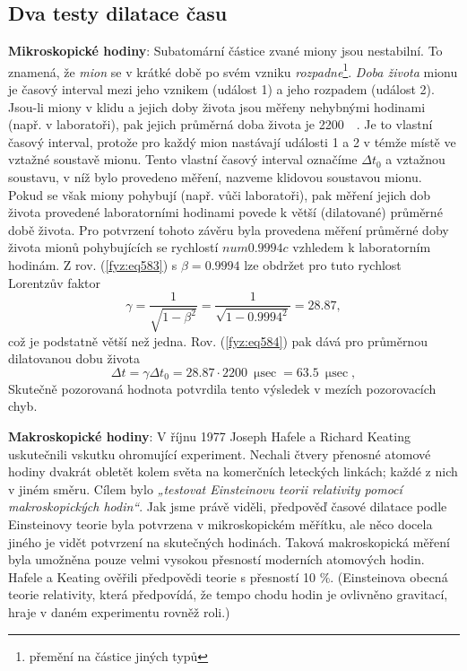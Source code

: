     \subsection{Dva testy dilatace času}
      \textbf{Mikroskopické hodiny}: Subatomární částice zvané miony jsou nestabilní. To znamená, že
      \emph{mion} se v krátké době po svém vzniku \emph{rozpadne}\footnote{přemění na částice jiných
      typů}. \emph{Doba života} mionu je časový interval mezi jeho vznikem (událost 1) a jeho
      rozpadem (událost 2). Jsou-li miony v klidu a jejich doby života jsou měřeny nehybnými
      hodinami (např. v laboratoři), pak jejich průměrná doba života je \SI{2 200}{\micro\sec}. Je
      to vlastní časový interval, protože pro každý mion nastávají události 1 a 2 v témže místě ve
      vztažné soustavě mionu. Tento vlastní časový interval označíme \(\Delta t_0\) a vztažnou
      soustavu, v níž bylo provedeno měření, nazveme klidovou soustavou mionu. Pokud se však miony
      pohybují (např. vůči laboratoři), pak měření jejich dob života provedené laboratorními
      hodinami povede k větší (dilatované) průměrné době života. Pro potvrzení tohoto závěru byla
      provedena měření průměrné doby života mionů pohybujících se rychlostí \(num{0.999 4}c\)
      vzhledem k laboratorním hodinám. Z rov. (\ref{fyz:eq583}) s \(\beta = \num{0.999 4}\) lze
      obdržet pro tuto rychlost Lorentzův faktor
      \begin{equation*}
        \gamma = \dfrac{1}{\sqrt{1-\beta^2}} = \dfrac{1}{\sqrt{1-\num{0.999 4}^2}} = \num{28.87},
      \end{equation*}
      což je podstatně větší než jedna. Rov. (\ref{fyz:eq584}) pak dává pro průměrnou dilatovanou
      dobu života
      \begin{equation*}
        \Delta t = \gamma\Delta t_0=\num{28.87}\cdot\SI{2 200}{\micro\sec}=\SI{63.5}{\micro\sec},
      \end{equation*}
      Skutečně pozorovaná hodnota potvrdila tento výsledek v mezích pozorovacích chyb.

      \textbf{Makroskopické hodiny}: V říjnu 1977 Joseph Hafele a Richard Keating uskutečnili
      vskutku ohromující experiment. Nechali čtvery přenosné atomové hodiny dvakrát obletět kolem
      světa na komerčních leteckých linkách; každé z nich v jiném směru. Cílem bylo \emph{„testovat
      Einsteinovu teorii relativity pomocí makroskopických hodin“}. Jak jsme právě viděli, předpověď
      časové dilatace podle Einsteinovy teorie byla potvrzena v mikroskopickém měřítku, ale něco
      docela jiného je vidět potvrzení na skutečných hodinách. Taková makroskopická měření byla
      umožněna pouze velmi vysokou přesností moderních atomových hodin. Hafele a Keating ověřili
      předpovědi teorie s přesností 10 \%. (Einsteinova obecná teorie relativity, která předpovídá,
      že tempo chodu hodin je ovlivněno gravitací, hraje v daném experimentu rovněž roli.) 
      
